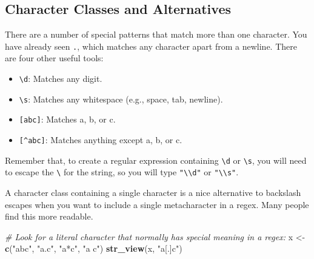 \documentclass[
]{book}
\newenvironment{Shaded}{\begin{snugshade}}{\end{snugshade}}
\newcommand{\CommentTok}[1]{\textcolor[rgb]{0.56,0.35,0.01}{\textit{#1}}}
\newcommand{\KeywordTok}[1]{\textcolor[rgb]{0.13,0.29,0.53}{\textbf{#1}}}
\newcommand{\NormalTok}[1]{#1}
\newcommand{\StringTok}[1]{\textcolor[rgb]{0.31,0.60,0.02}{#1}}
\providecommand{\tightlist}{%
  \setlength{\itemsep}{0pt}\setlength{\parskip}{0pt}}
\begin{document}
\hypertarget{htmlwidget-1fb4450895fe099f74a1}{}

\begin{Shaded}
\end{Shaded}

\hypertarget{htmlwidget-10b3b7155e8045a1b2ad}{}

\hypertarget{character-classes-and-alternatives}{%
\subsection{Character Classes and Alternatives}\label{character-classes-and-alternatives}}

There are a number of special patterns that match more than one character. You have already seen \texttt{.}, which matches any character apart from a newline. There are four other useful tools:

\begin{itemize}
\tightlist
\item
  \texttt{\textbackslash{}d}: Matches any digit.
\item
  \texttt{\textbackslash{}s}: Matches any whitespace (e.g., space, tab, newline).
\item
  \texttt{{[}abc{]}}: Matches a, b, or c.
\item
  \texttt{{[}\^{}abc{]}}: Matches anything except a, b, or c.
\end{itemize}

Remember that, to create a regular expression containing \texttt{\textbackslash{}d} or \texttt{\textbackslash{}s}, you will need to escape the \texttt{\textbackslash{}} for the string, so you will type \texttt{"\textbackslash{}\textbackslash{}d"} or \texttt{"\textbackslash{}\textbackslash{}s"}.

A character class containing a single character is a nice alternative to backslash escapes when you want to include a single metacharacter in a regex. Many people find this more readable.

\begin{Shaded}
\begin{Highlighting}[]
\CommentTok{# Look for a literal character that normally has special meaning in a regex:}
\NormalTok{x <-}\StringTok{ }\KeywordTok{c}\NormalTok{(}\StringTok{"abc"}\NormalTok{, }\StringTok{"a.c"}\NormalTok{, }\StringTok{"a*c"}\NormalTok{, }\StringTok{"a c"}\NormalTok{)}
\KeywordTok{str_view}\NormalTok{(x, }\StringTok{"a[.]c"}\NormalTok{)}
\end{Highlighting}
\end{Shaded}
\end{document}
